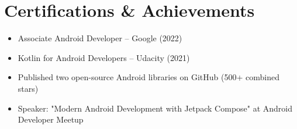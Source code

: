 \documentclass[a4paper,11pt]{article}
\begin{document}
\section{Certifications \& Achievements}
\begin{itemize}[leftmargin=0.12in, label={}]
    \item Associate Android Developer -- Google (2022)
    \item Kotlin for Android Developers -- Udacity (2021)
    \item Published two open-source Android libraries on GitHub (500+ combined stars)
    \item Speaker: "Modern Android Development with Jetpack Compose" at Android Developer Meetup
\end{itemize}
\end{document}
